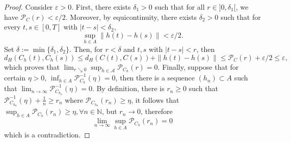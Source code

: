 \documentclass[10pt,a4paper]{amsart}
\newcommand{\N}{\mathbb{N}}
\renewcommand{\epsilon}{\varepsilon}
\begin{document}
	\begin{proof}
	Consider $\epsilon>0$. First, there exists $\delta_1>0$ such that for all $r\in ]0,\delta_1[$, we have $\mathscr{P}_C(r)<\epsilon/2$. Moreover, by equicontinuity, there exists $\delta_2>0$ such that for every $t,s\in [0,T]$ with $|t-s|<\delta_2$, $$\sup_{h\in A}\|h(t)-h(s)\|<\epsilon/2.$$
    Set $\delta:=\min\{\delta_1,\delta_2\}$. Then, for $r<\delta$ and $t,s$ with $|t-s|< r$, then
		\begin{equation*}
			d_H(C_h(t),C_h(s)) \leq d_H(C(t),C(s)) + \|h(t)-h(s)\|
			\leq \mathscr{P}_C(r) + \epsilon/2\leq \epsilon,
		\end{equation*}
		which proves that $\displaystyle\lim_{r\searrow 0}\sup_{h\in \mathcal{A}}\mathscr{P}_{C_h}(r) = 0$. Finally, suppose that for certain $\eta>0$, $\inf_{h\in A} \mathscr{P}_{C_h}^{-1}(\eta)=0$, then there is a sequence $(h_n)\subset A$ such that $\displaystyle\lim_{n\to \infty}\mathscr{P}_{C_{h_n}}^{-1}(\eta)=0$. By definition, there is $r_n\geq 0$ such that $\mathscr{P}_{C_{h_n}}^{-1}(\eta) + \frac{1}{n}\geq r_n$ where $\mathscr{P}_{C_{h_n}}(r_n)\geq \eta$, it follows that $\sup_{h\in A} \mathscr{P}_{C_{h}}(r_n)\geq \eta, \forall n\in \N$, but $r_n\to 0$, therefore $$\displaystyle\lim_{n\to\infty} \sup_{h\in A} \mathscr{P}_{C_{h}}(r_n) = 0$$ which is a contradiction. 
	\end{proof}
\end{document}
